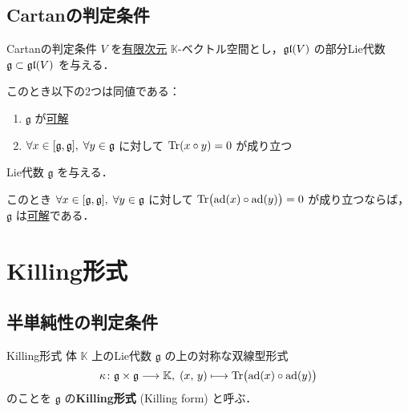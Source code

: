 \documentclass[rep_main]{subfiles}
\begin{document}
\subsection{Cartanの判定条件}

\begin{mytheo}[label=thm:Cartan-crit]{Cartanの判定条件}
	$V$ を\underline{有限次元} $\mathbb{K}$-ベクトル空間とし，$\mathfrak{gl} (V)$ の部分Lie代数 $\mathfrak{g} \subset \mathfrak{gl} (V)$ を与える．

	このとき以下の2つは同値である：
	\begin{enumerate}
		\item $\mathfrak{g}$ が\hyperref[def:solvable-LieAlg]{可解}
		\item $\forall x \in \comm{\mathfrak{g}}{\mathfrak{g}},\; \forall y \in \mathfrak{g}$ に対して $\Tr (x \circ y) = 0$ が成り立つ
	\end{enumerate}
	
\end{mytheo}

\begin{mycol}[label=col:Cartan-crit]{}
	Lie代数 $\mathfrak{g}$ を与える．
	
	このとき $\forall x \in \comm{\mathfrak{g}}{\mathfrak{g}},\; \forall y \in \mathfrak{g}$ に対して $\Tr \bigl(\operatorname{ad} (x) \circ \operatorname{ad} (y)\bigr) = 0$ が成り立つならば，$\mathfrak{g}$ は\hyperref[def:solvable-LieAlg]{可解}である．
\end{mycol}


\section{Killing形式}

\subsection{半単純性の判定条件}


\begin{mydef}[label=def:Killing-form]{Killing形式}
	体 $\mathbb{K}$ 上のLie代数 $\mathfrak{g}$ の上の対称な双線型形式
	\begin{align}
		\kappa \colon \mathfrak{g} \times \mathfrak{g} \longrightarrow \mathbb{K},\; (x,\, y) \longmapsto \Tr \bigl( \operatorname{ad}(x) \circ \operatorname{ad}(y) \bigr) 
	\end{align}
	のことを $\mathfrak{g}$ の\textbf{Killing形式} (Killing form) と呼ぶ．
\end{mydef}
\end{document}
